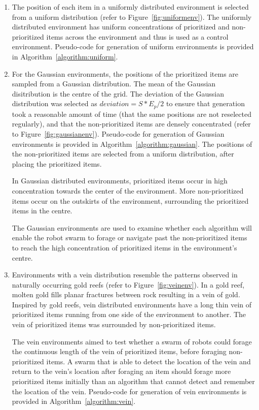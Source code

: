 \documentclass[preprint,12pt]{elsarticle}
\begin{document}
\begin{enumerate}

\item The position of each item in a uniformly distributed environment is selected from a uniform distribution (refer to Figure~\ref{fig:uniformenv}). The uniformly distributed environment has uniform concentrations of prioritized and non-prioritized items across the environment and thus is used as a control environment. Pseudo-code for generation of uniform environments is provided in Algorithm~\ref{algorithm:uniform}.

\item For the Gaussian environments, the positions of the prioritized items are sampled from a Gaussian distribution. The mean of the Gaussian disitribution is the centre of the grid. The deviation of the Gaussian distribution was selected as $deviation = S*E_p/2$ to ensure that generation took a reasonable amount of time (that the same positions are not reselected regularly), and that the non-prioritized items are densely concentrated  (refer to Figure~\ref{fig:gaussianenv}). Pseudo-code for generation of Gaussian environments is provided in Algorithm~\ref{algorithm:gaussian}. The positions of the non-prioritized items are selected from a uniform distribution, after placing the prioritized items. 

In Gaussian distributed environments, prioritized items  occur in high concentration towards the center of the environment. More non-prioritized items occur on the outskirts of the environment, surrounding the prioritized items in the centre.

The Gaussian environments are used to examine whether each algorithm will enable the robot swarm to forage or navigate past the non-prioritized items to reach the high concentration of prioritized items in the environment's centre. 


\item Environments with a vein distribution resemble the patterns observed in naturally occurring gold reefs \cite{frimmel2002recent} (refer to Figure~\ref{fig:veinenv}). In a gold reef, molten gold fills planar fractures between rock resulting in a vein of gold. Inspired by gold reefs, vein distributed environments have a long thin vein of prioritized items running from one side of the environment to another. The vein of prioritized items was surrounded by non-prioritized items. 

The vein environments aimed to test whether a swarm of robots could forage the continuous length of the vein of prioritized items, before foraging non-prioritized items. A swarm that is able to detect the location of the vein and return to the vein's location after foraging an item should forage more prioritized items initially than an algorithm that cannot detect and remember the location of the vein.  Pseudo-code for generation of vein environments is provided in Algorithm~\ref{algorithm:vein}.



\end{enumerate}
\end{document}
